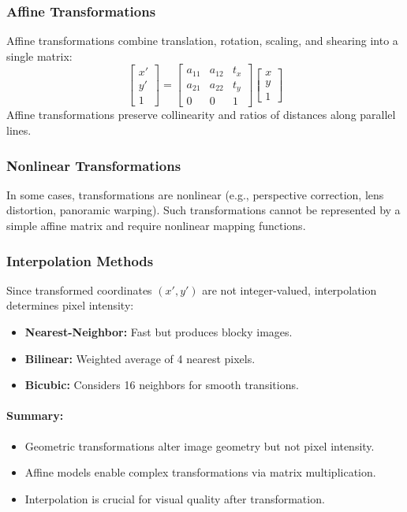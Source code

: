 \documentclass[12pt,a4paper]{AnantDocumentation}
\begin{document}
\subsubsection{Affine Transformations}
Affine transformations combine translation, rotation, scaling, and shearing into a single matrix:
\begin{equation}
\begin{bmatrix} x' \\ y' \\ 1 \end{bmatrix} =
\begin{bmatrix}
a_{11} & a_{12} & t_x \\
a_{21} & a_{22} & t_y \\
0 & 0 & 1
\end{bmatrix}
\begin{bmatrix} x \\ y \\ 1 \end{bmatrix}
\end{equation}
Affine transformations preserve collinearity and ratios of distances along parallel lines.

\subsubsection{Nonlinear Transformations}
In some cases, transformations are nonlinear (e.g., perspective correction, lens distortion, panoramic warping).  
Such transformations cannot be represented by a simple affine matrix and require nonlinear mapping functions.

\subsubsection{Interpolation Methods}
Since transformed coordinates $(x', y')$ are not integer-valued, interpolation determines pixel intensity:
\begin{itemize}
\item \textbf{Nearest-Neighbor:} Fast but produces blocky images.
\item \textbf{Bilinear:} Weighted average of 4 nearest pixels.
\item \textbf{Bicubic:} Considers 16 neighbors for smooth transitions.
\end{itemize}

\paragraph{Summary:}
\begin{itemize}
\item Geometric transformations alter image geometry but not pixel intensity.
\item Affine models enable complex transformations via matrix multiplication.
\item Interpolation is crucial for visual quality after transformation.
\end{itemize}
\end{document}
